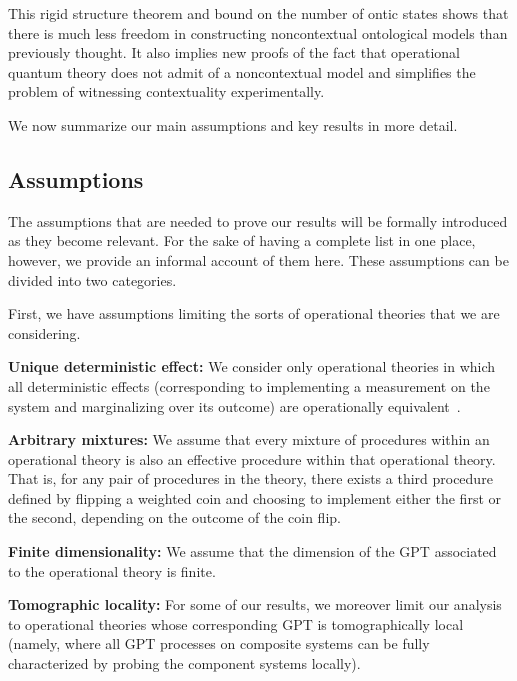\documentclass[onecolum,aps,groupedaddress,nofootinbib]{revtex4-2}
\newcommand{\david}{\color{blue}}
\newcommand{\blk}{\color{black}}
\begin{document}
This rigid structure theorem and bound on the number of ontic states shows that there is much less freedom in constructing noncontextual ontological models than previously thought.
 It also implies new proofs of the fact that operational quantum theory does not admit of a noncontextual model and simplifies the problem of witnessing contextuality experimentally.

We now summarize our main assumptions and key results in more detail.


\subsection{Assumptions} \label{secassumptions}

The assumptions that are needed to prove our results
will be formally introduced as they become relevant.
 For the sake of having a complete list in one place, however, we provide an informal account of them here. These assumptions can be divided into two categories.

First, we have assumptions limiting the sorts of operational theories that we are considering.
\ben
\item {\bf Unique deterministic effect:} We consider only operational theories
in which all deterministic effects (corresponding to implementing a measurement on the system and marginalizing over its outcome) are operationally equivalent~\cite{chiribella2010probabilistic}.
\item {\bf Arbitrary mixtures:} We assume that every mixture of procedures within an operational theory is also an effective procedure within that operational theory. That is, for any pair of procedures in the theory, there exists a third procedure defined by flipping
a weighted coin and choosing to implement either the first or the second, depending on the outcome of the coin flip.
\item  {\bf Finite dimensionality:} We assume that the dimension of the GPT associated to the operational theory is finite.
\item {\bf Tomographic locality:} For some of our results, we moreover limit our analysis to operational theories 
 whose corresponding GPT is tomographically local (namely, where all GPT processes on composite systems can be fully characterized by probing the component systems locally).  
\een
\end{document}
